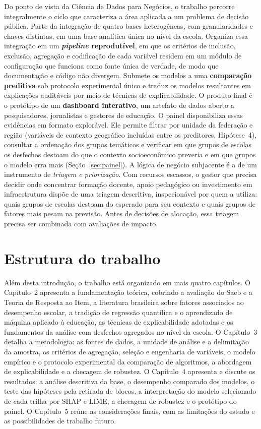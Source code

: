 Do ponto de vista da Ciência de Dados para Negócios, o
trabalho percorre integralmente o ciclo que caracteriza a área aplicada a
um problema de decisão pública. Parte da integração de quatro bases
heterogêneas, com granularidades e chaves distintas, em uma base analítica
única no nível da escola. Organiza essa integração em um \textbf{\textit{pipeline}
reprodutível}, em que os critérios de inclusão, exclusão, agregação e
codificação de cada variável residem em um módulo de configuração que
funciona como fonte única de verdade, de modo que documentação e código não
divergem. Submete os modelos a uma \textbf{comparação preditiva} sob
protocolo experimental único e traduz os modelos resultantes em
explicações auditáveis por meio de técnicas de explicabilidade. O produto
final é o protótipo de um \textbf{dashboard
interativo}, um artefato de dados aberto a pesquisadores, jornalistas e
gestores de educação. O painel
disponibiliza essas evidências em formato explorável. Ele permite filtrar
por unidade da federação e região (variáveis de contexto geográfico
incluídas entre os preditores, Hipótese~4), consultar a ordenação dos
grupos temáticos e verificar em que grupos de escolas os desfechos
destoam do que o contexto socioeconômico preveria e em que grupos o
modelo erra mais (Seção~\ref{sec:painel}). A lógica de negócio subjacente é a de um
instrumento de \emph{triagem e priorização}. Com recursos escassos, o
gestor que precisa decidir onde concentrar formação docente, apoio
pedagógico ou investimento em infraestrutura dispõe de uma triagem
descritiva, inspecionável por quem a utiliza: quais grupos de escolas
destoam do esperado para seu contexto e quais grupos de fatores mais pesam na
previsão. Antes de decisões de alocação, essa triagem precisa ser combinada
com avaliações de impacto.

\section{Estrutura do trabalho}

Além desta introdução, o trabalho está organizado em mais quatro capítulos.
O Capítulo~2 apresenta a fundamentação teórica, cobrindo a avaliação do
Saeb e a Teoria de Resposta ao Item, a literatura brasileira sobre fatores
associados ao desempenho escolar, a tradição de regressão quantílica e o
aprendizado de máquina aplicado à educação, as técnicas de explicabilidade
adotadas e os fundamentos da análise com desfechos agregados no nível da
escola. O Capítulo~3 detalha a metodologia: as fontes de dados, a unidade
de análise e a delimitação da amostra, os critérios de agregação, seleção e
engenharia de variáveis, o modelo empírico e o protocolo experimental da
comparação de algoritmos, a abordagem de explicabilidade e a checagem de
robustez. O Capítulo~4 apresenta e discute os resultados: a análise
descritiva da base, o desempenho comparado dos modelos, o teste das
hipóteses pela retirada de blocos, a interpretação do modelo selecionado de
cada trilha por SHAP e LIME, a checagem de robustez e o protótipo do
painel. O Capítulo~5 reúne as
considerações finais, com as limitações do estudo e as possibilidades de
trabalho futuro.



